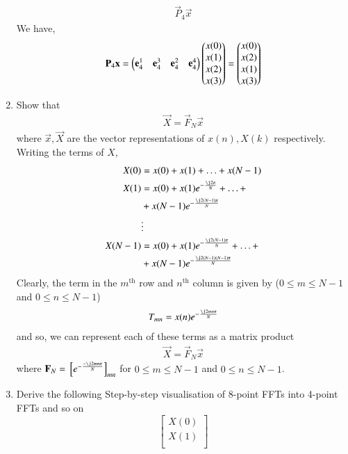 \documentclass[journal,12pt,twocolumn]{IEEEtran}
\renewcommand\thesection{\arabic{section}}
\begin{document}
\begin{enumerate}[label=\thesection.\arabic*]
    \begin{align}
	     \vec{P}_4 \vec{x}
    \end{align}
\solution We have,
\begin{align}
	\mathbf{P}_4\mathbf{x} = \begin{pmatrix}\mathbf{e}_4^1 & \mathbf{e}_4^3 & \mathbf{e}_4^2 & \mathbf{e}_4^4\end{pmatrix}\begin{pmatrix}x(0)\\x(1)\\x(2)\\x(3)\end{pmatrix} = \begin{pmatrix}x(0)\\x(2)\\x(1)\\x(3)\end{pmatrix}
	\label{eq:x-permute}
\end{align}
\item Show that 
    \begin{align}
	    \vec{X} = \vec{F}_N\vec{x}
	    \label{eq:dft-mat-def}
    \end{align}
		where $\vec{x}, \vec{X}$ are the vector representations of $x(n), X(k)$ respectively.\\
\solution Writing the terms of $X$, 
\begin{align}
	X(0) &= x(0) + x(1) + \ldots + x(N - 1) \\
	X(1) &= x(0) + x(1)e^{-\frac{\j2\pi}{N}} + \ldots + \nonumber \\
		 &+ x(N - 1)e^{-\frac{\j2(N - 1)\pi}{N}} \\
		 &\vdots \nonumber \\
	X(N - 1) &= x(0) + x(1)e^{-\frac{\j2(N - 1)\pi}{N}} + \ldots + \nonumber \\
			 &+ x(N - 1)e^{-\frac{\j2(N - 1)(N - 1)\pi}{N}}	
\end{align}
Clearly, the term in the $m^{\text{th}}$ row and $n^{\text{th}}$ column is given by ($0 \leq m \leq N - 1$ and $0 \leq n \leq N - 1$) 
\begin{align}
	T_{mn} = x(n)e^{-\frac{\j2mn\pi}{N}} 
\end{align}
and so, we can represent each of these terms as a matrix product
\begin{align}
	\vec{X} = \vec{F}_N\vec{x}
\end{align}
where $\vec{F}_N = \sbrak{e^{-\frac{-\j2mn\pi}{N}}}_{mn}$ for $0 \leq m \leq N - 1$ and $0 \leq n \leq N - 1$. 
\item Derive the following Step-by-step visualisation  of
8-point FFTs into 4-point FFTs and so on
\begin{equation}
\begin{bmatrix}
X(0) \\ 
X(1) \\ 

\end{bmatrix}
\end{equation}
\end{enumerate}
\end{document}
